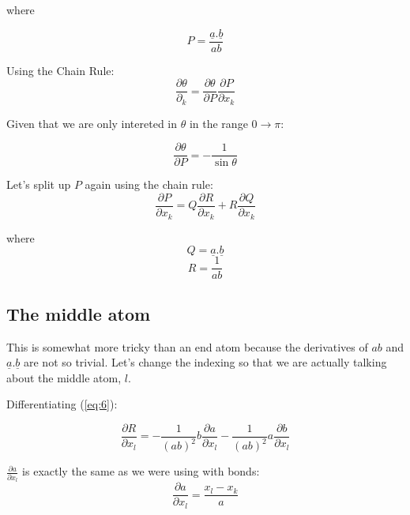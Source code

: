 where 

\begin{displaymath}
  P = \frac{{\underline a}.{\underline b}}{ab} 
\end{displaymath}

Using the Chain Rule:
\begin{equation}
  \label{eq:2}
  \frac{\partial \theta}{\partial _k} = \frac{\partial \theta}{\partial P} \frac{\partial P}{\partial x_k}
\end{equation}

Given that we are only intereted in $\theta$ in the range $0\rightarrow\pi$:

\begin{equation}
  \label{eq:3}
  \frac{\partial \theta}{\partial P} = -\frac{1}{\sin \theta}
\end{equation}

Let's split up $P$ again using the chain rule: 
\begin{equation}
  \label{eq:4}
  \frac{\partial P}{\partial x_k} = 
  Q\frac{\partial R}{\partial x_k} + R\frac{\partial Q}{\partial x_k}
\end{equation}

where 
\begin{equation}
  \label{eq:5}
  Q =  {\underline a}.{\underline b}
\end{equation}
\begin{equation}
  \label{eq:6}
  R = \frac{1}{ab}
\end{equation}

\subsection{The middle atom}

This is somewhat more tricky than an end atom because the derivatives
of $ab$ and ${\underline a}.{\underline b}$ are not so trivial.  Let's
change the indexing so that we are actually talking about the middle
atom, $l$.

Differentiating (\ref{eq:6}): 

\begin{equation}
  \label{eq:7}
  \frac{\partial R}{\partial x_l} = 
  -\frac{1}{(ab)^2}b\frac{\partial a}{\partial x_l} 
  -\frac{1}{(ab)^2}a\frac{\partial b}{\partial x_l}
\end{equation}

$\frac{\partial a}{\partial x_l}$ is exactly the same as we were using
with bonds:
\begin{displaymath}
  \frac{\partial a}{\partial x_l} = \frac{x_l-x_k}{a}
\end{displaymath}

